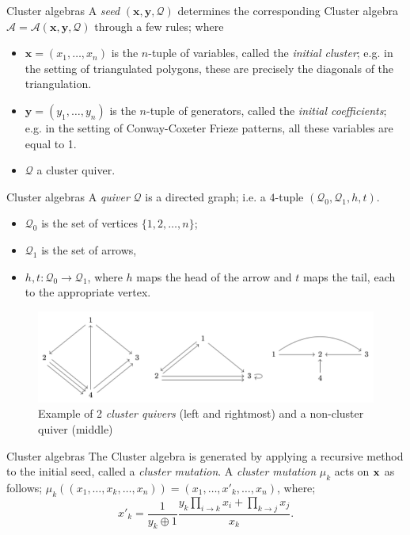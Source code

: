 \documentclass{beamer}
\begin{document}
\begin{frame}{Cluster algebras}
     A \emph{seed} $(\mathbf{x},\mathbf{y},\mathcal{Q})$ determines the corresponding Cluster algebra $\mathcal{A} = \mathcal{A}(\mathbf{x},\mathbf{y},\mathcal{Q})$ through a few rules; where
     \pause
    \begin{itemize}
        \item $\mathbf{x}=(x_1,\dots,x_n)$ is the   $n$-tuple of variables, called the \emph{initial cluster}; e.g. in the setting of triangulated polygons, these are precisely the diagonals of the triangulation.
        \pause
        \item $\mathbf{y}=(y_1,\dots,y_n)$ is the $n$-tuple of generators, called the \emph{initial coefficients}; e.g. in the setting of Conway-Coxeter Frieze patterns, all these variables are equal to 1. 
        \pause
        \item $\mathcal{Q}$ a cluster quiver.
    \end{itemize}
\end{frame}

\begin{frame}{Cluster algebras}
    A \emph{quiver} $\mathcal{Q}$ is a directed graph; i.e. a $4$-tuple $(\mathcal{Q}_0, \mathcal{Q}_1, h, t)$.
    \begin{itemize}
        \item $\mathcal{Q}_0$ is the set of vertices $\{1,2,\dots, n\}$; \pause
        \item $\mathcal{Q}_1$ is the set of arrows,\pause
        \item $h,t : \mathcal{Q}_0 \to \mathcal{Q}_1$, where $h$ maps the head of the arrow and $t$ maps the tail, each to the appropriate vertex.
    \end{itemize}
    \pause
\begin{figure}[H]
    \centering
    \includegraphics[width = 11 cm]{Images/quivers.png}
    \caption{Example of 2 \emph{cluster quivers} (left and rightmost) and a non-cluster quiver (middle)}
    \label{fig:my_label}
\end{figure}
\end{frame}

\begin{frame}{Cluster algebras}
The Cluster algebra is generated by applying a recursive method to the initial seed, called a \emph{cluster mutation}. A \emph{cluster mutation} $\mu_k$ acts on $\bold{x}$ as follows; $\mu_k((x_1,\dots,x_k,\dots, x_n)) = (x_1,\dots,x'_k,\dots,x_n)$, where; \pause
\begin{equation*}
    x'_k = \dfrac{1}{y_k \oplus 1}\dfrac{y_k\prod_{i \to k}x_i + \prod_{k \to j}x_j}{x_k}.
\end{equation*}
\end{frame}
\end{document}
